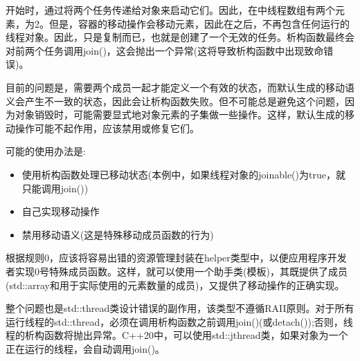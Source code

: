 开始时，通过将两个任务传递给对象来启动它们。因此，在中线程数组有两个元素，为2。但是，容器的移动操作会移动元素，因此在之后，不再包含任何运行的线程对象。因此，只是复制而已，也就是创建了一个无效的任务。析构函数最终会对前两个任务调用join()，这会抛出一个异常(这将导致析构函数中出现致命错误)。

目前的问题是，需要两个成员一起才能定义一个有效的状态，而默认生成的移动语义会产生不一致的状态，因此会让析构函数失败。但不可能总是避免这个问题，因为对象销毁时，可能需要显式地对象元素的子集做一些操作。这样，默认生成的移动操作可能不起作用，应该禁用或修复它们。

可能的使用办法是:

\begin{itemize}
	\item 使用析构函数处理已移动状态(本例中，如果线程对象的joinable()为true，就只能调用join())
	\item 自己实现移动操作
	\item 禁用移动语义(这是特殊移动成员函数的行为)
\end{itemize}

根据规则0，应该将容易出错的资源管理封装在helper类型中，以便应用程序开发者实现0号特殊成员函数。这样，就可以使用一个助手类(模板)，其既提供了成员(std::array和用于实际使用的元素数量的成员)，又提供了移动操作的正确实现。

整个问题也是std::thread类设计错误的副作用，该类型不遵循RAII原则。对于所有运行线程的std::thread，必须在调用析构函数之前调用join()(或detach());否则，线程的析构函数将抛出异常。C++20中，可以使用std::jthread类，如果对象为一个正在运行的线程，会自动调用join()。




















